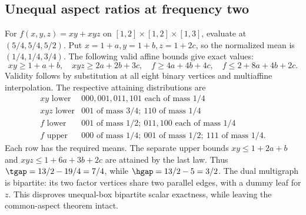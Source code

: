 \subsection{Unequal aspect ratios at frequency two}
\begin{example}\label{ex:unequal-seven-six}
For $f(x,y,z)=xy+xyz$ on $[1,2]\times[1,2]\times[1,3]$, evaluate at
$(5/4,5/4,5/2)$. Put $x=1+a,y=1+b,z=1+2c$, so the normalized mean is
$(1/4,1/4,3/4)$. The following valid affine bounds give exact values:
\[
 xy\ge1+a+b,\quad xyz\ge2a+2b+3c,\quad
 f\ge4a+4b+4c,\quad f\le2+8a+4b+2c.
\]
Validity follows by substitution at all eight binary vertices and
multiaffine interpolation. The respective attaining distributions are
\[
\begin{array}{c|l}
 xy\text{ lower}&000,001,011,101\text{ each of mass }1/4\\
 xyz\text{ lower}&001\text{ of mass }3/4;\ 110\text{ of mass }1/4\\
 f\text{ lower}&001\text{ of mass }1/2;\ 011,100\text{ each of mass }1/4\\
 f\text{ upper}&000\text{ of mass }1/4;\ 001\text{ of mass }1/2;
                         \ 111\text{ of mass }1/4.
\end{array}
\]
Each row has the required means. The separate upper bounds
$xy\le1+2a+b$ and $xyz\le1+6a+3b+2c$ are attained by the last law.
Thus $\tgap=13/2-19/4=7/4$, while $\hgap=13/2-5=3/2$.
The dual multigraph is bipartite: its two factor vertices share two
parallel edges, with a dummy leaf for $z$. This disproves unequal-box
bipartite scalar exactness, while leaving the common-aspect theorem intact.
\end{example}

